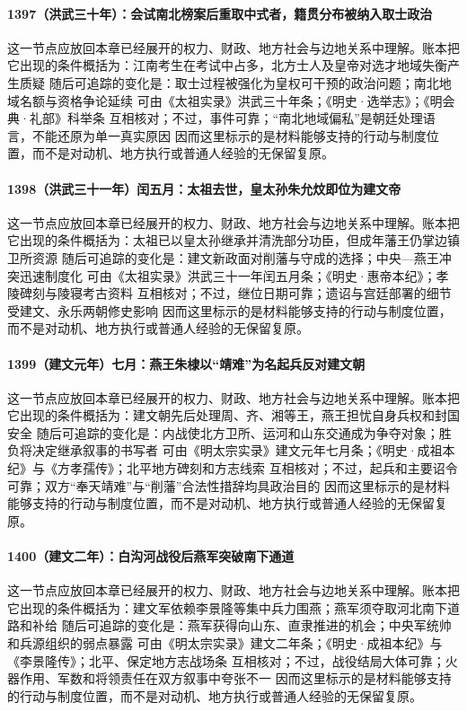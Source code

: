 \paragraph{1397（洪武三十年）：会试南北榜案后重取中式者，籍贯分布被纳入取士政治} 这一节点应放回本章已经展开的权力、财政、地方社会与边地关系中理解。账本把它出现的条件概括为：江南考生在考试中占多，北方士人及皇帝对选才地域失衡产生质疑 随后可追踪的变化是：取士过程被强化为皇权可干预的政治问题；南北地域名额与资格争论延续 可由《太祖实录》洪武三十年条；《明史·选举志》；《明会典·礼部》科举条 互相核对；不过，事件可靠；“南北地域偏私”是朝廷处理语言，不能还原为单一真实原因 因而这里标示的是材料能够支持的行动与制度位置，而不是对动机、地方执行或普通人经验的无保留复原。

\paragraph{1398（洪武三十一年）闰五月：太祖去世，皇太孙朱允炆即位为建文帝} 这一节点应放回本章已经展开的权力、财政、地方社会与边地关系中理解。账本把它出现的条件概括为：太祖已以皇太孙继承并清洗部分功臣，但成年藩王仍掌边镇卫所资源 随后可追踪的变化是：建文新政面对削藩与守成的选择；中央—燕王冲突迅速制度化 可由《太祖实录》洪武三十一年闰五月条；《明史·惠帝本纪》；孝陵碑刻与陵寝考古资料 互相核对；不过，继位日期可靠；遗诏与宫廷部署的细节受建文、永乐两朝修史影响 因而这里标示的是材料能够支持的行动与制度位置，而不是对动机、地方执行或普通人经验的无保留复原。

\paragraph{1399（建文元年）七月：燕王朱棣以“靖难”为名起兵反对建文朝} 这一节点应放回本章已经展开的权力、财政、地方社会与边地关系中理解。账本把它出现的条件概括为：建文朝先后处理周、齐、湘等王，燕王担忧自身兵权和封国安全 随后可追踪的变化是：内战使北方卫所、运河和山东交通成为争夺对象；胜负将决定继承叙事的书写者 可由《明太宗实录》建文元年七月条；《明史·成祖本纪》与《方孝孺传》；北平地方碑刻和方志线索 互相核对；不过，起兵和主要诏令可靠；双方“奉天靖难”与“削藩”合法性措辞均具政治目的 因而这里标示的是材料能够支持的行动与制度位置，而不是对动机、地方执行或普通人经验的无保留复原。

\paragraph{1400（建文二年）：白沟河战役后燕军突破南下通道} 这一节点应放回本章已经展开的权力、财政、地方社会与边地关系中理解。账本把它出现的条件概括为：建文军依赖李景隆等集中兵力围燕；燕军须夺取河北南下道路和补给 随后可追踪的变化是：燕军获得向山东、直隶推进的机会；中央军统帅和兵源组织的弱点暴露 可由《明太宗实录》建文二年条；《明史·成祖本纪》与《李景隆传》；北平、保定地方志战场条 互相核对；不过，战役结局大体可靠；火器作用、军数和将领责任在双方叙事中夸张不一 因而这里标示的是材料能够支持的行动与制度位置，而不是对动机、地方执行或普通人经验的无保留复原。


